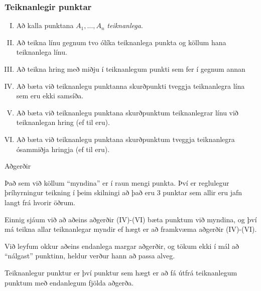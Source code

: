 \begin{frame}
  \frametitle{Teiknanlegir punktar}
  \begin{skgr}
    \begin{enumerate}[(I)]
    \item Að kalla punktana  \(A_1, \dotsc, A_n\)  \emph{teiknanlega}.
    \item Að teikna línu gegnum tvo ólíka teiknanlega punkta og köllum hana teiknanlega línu.
    \item Að teikna hring með miðju í teiknanlegum punkti sem fer í gegnum annan

    \item Að bæta við teiknanlegu punktanna skurðpunkti tveggja teiknanlegra lína
      sem eru ekki samsíða.
    \item Að bæta við teiknanlegu punktana skurðpunktum teiknanlegrar línu
      við teiknanlegan hring (ef til eru).
    \item Að bæta við teiknanlegu punktana skurðpunktum tveggja teiknanlegra
      ósammiðja hringja (ef til eru).
    \end{enumerate}
  \end{skgr}
\end{frame}

\begin{frame}{Aðgerðir}
\begin{ath}
 Það sem við köllum ``myndina''  er í raun mengi punkta.
 Því er reglulegur þríhyrningur teikning í þeim skilningi að það
 eru 3 punktar sem allir eru jafn langt frá hvorir öðrum.
 
 Einnig sjáum við að aðeins aðgerðir (IV)-(VI) bæta punktum við myndina, og því
 má teikna allar teiknanlegar myndir ef hægt er að framkvæma aðgerðir
 (IV)-(VI).

 Við leyfum okkur aðeins endanlega margar aðgerðir, og tökum
 ekki í mál að ``nálgast'' punktinn, heldur verður hann að passa alveg.

 Teiknanlegur punktur er því punktur sem hægt er að fá útfrá teiknanlegum punktum
 með endanlegum fjölda aðgerða.
\end{ath}
\end{frame}


